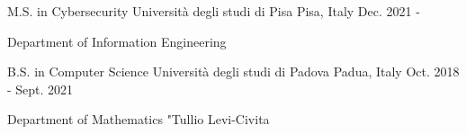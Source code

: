 
\begin{cventries}


  \cventry
  {M.S. in Cybersecurity} %
  {Università degli studi di Pisa} %
  {Pisa, Italy} %
  {Dec. 2021 - } %
  {
    \begin{cvitems}
    \item{Department of Information Engineering}
    \end{cvitems}
  }

  \cventry
  {B.S. in Computer Science} %
  {Università degli studi di Padova} %
  {Padua, Italy} %
  {Oct. 2018 - Sept. 2021} %
  {
    \begin{cvitems} %
    \item{Department of Mathematics "Tullio Levi-Civita}
    \end{cvitems}
  }

\end{cventries}
